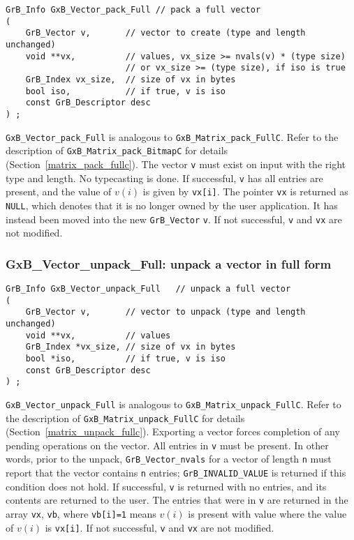 \documentclass[12pt]{article}
\begin{document}
\begin{mdframed}[userdefinedwidth=6in]
{\footnotesize
\begin{verbatim}
GrB_Info GxB_Vector_pack_Full // pack a full vector
(
    GrB_Vector v,       // vector to create (type and length unchanged)
    void **vx,          // values, vx_size >= nvals(v) * (type size)
                        // or vx_size >= (type size), if iso is true
    GrB_Index vx_size,  // size of vx in bytes
    bool iso,           // if true, v is iso
    const GrB_Descriptor desc
) ;
\end{verbatim}
} \end{mdframed}

\noindent
\verb'GxB_Vector_pack_Full' is analogous to \verb'GxB_Matrix_pack_FullC'.
Refer to the description of \verb'GxB_Matrix_pack_BitmapC' for details
(Section~\ref{matrix_pack_fullc}).
The vector \verb'v' must exist on input with the right type and length.
No typecasting is done.
If successful, \verb'v' has
all entries are present, and the value of $v(i)$ is given by \verb'vx[i]'.
The pointer \verb'vx' is returned as \verb'NULL', which denotes that it is no
longer owned by the user application.  It has instead been moved into the new
\verb'GrB_Vector' \verb'v'.
If not successful, \verb'v' and
\verb'vx' are not modified.

\subsubsection{{\sf GxB\_Vector\_unpack\_Full:} unpack a vector in full form}
\label{vector_unpack_full}

\begin{mdframed}[userdefinedwidth=6in]
{\footnotesize
\begin{verbatim}
GrB_Info GxB_Vector_unpack_Full   // unpack a full vector
(
    GrB_Vector v,       // vector to unpack (type and length unchanged)
    void **vx,          // values
    GrB_Index *vx_size, // size of vx in bytes
    bool *iso,          // if true, v is iso
    const GrB_Descriptor desc
) ;
\end{verbatim}
} \end{mdframed}

\verb'GxB_Vector_unpack_Full' is analogous to \verb'GxB_Matrix_unpack_FullC'.
Refer to the description of \verb'GxB_Matrix_unpack_FullC' for details
(Section~\ref{matrix_unpack_fullc}).
Exporting a vector forces completion of any pending operations on the vector.
All entries in \verb'v' must be present.  In other words, prior to the unpack,
\verb'GrB_Vector_nvals' for a vector of length \verb'n' must report that the
vector contains \verb'n' entries; \verb'GrB_INVALID_VALUE' is returned if this
condition does not hold.
If successful, \verb'v' is returned with no entries, and its contents are
returned to the user. The entries
that were in \verb'v' are returned in the array \verb'vx', \verb'vb', where
\verb'vb[i]=1' means $v(i)$ is present with value where the value of $v(i)$ is
\verb'vx[i]'.
If not successful, \verb'v' and \verb'vx' are not modified.
\end{document}
